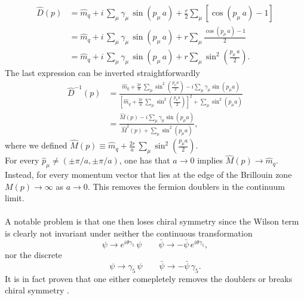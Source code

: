 \begin{equation*}
    \begin{aligned}
        \widehat{D}(p) &= \hat{m}_q + i \, \sum_\mu \gamma_\mu \, \sin\left( p_\mu \, a\right) + \frac{r}{2} \sum_\mu \left[\cos\left(p_\mu \, a\right) - 1\right] \\
        &= \hat{m}_q + i \, \sum_\mu \gamma_\mu \, \sin\left( p_\mu \, a\right) + r \sum_\mu \frac{\cos\left(p_\mu \, a\right) - 1}{2} \\
        &= \hat{m}_q + i \, \sum_\mu \gamma_\mu \, \sin\left( p_\mu \, a\right) + r \sum_\mu \sin^2\left(\frac{p_\mu \, a}{2}\right).
    \end{aligned}
\end{equation*}
The last expression can be inverted straightforwardly
\begin{equation*}
    \begin{aligned}
        \widehat{D}^{-1}(p) &= \frac{\hat{m}_q + \frac{2r}{a} \, \sum_\mu \sin ^2\left(\frac{p_\mu a}{2}\right) - i \sum_\mu \gamma_\mu \sin \left(p_\mu a\right)}{\left[\hat{m}_q + \frac{2r}{a} \, \sum_\mu \sin^2\left(\frac{p_\mu a}{2}\right)\right]^2 + \sum_\mu \sin^2 \left(p_\mu a\right)} \\
        &= \frac{\hat{M}(p) - i \sum_\mu \gamma_\mu \sin \left(p_\mu a\right)}{\hat{M}^2(p) + \sum_\mu \sin^2 \left(p_\mu a\right)},
    \end{aligned}
\end{equation*}
where we defined $\hat{M}(p) \equiv \hat{m}_q + \frac{2r}{a} \, \sum_\mu \sin ^2\left(\frac{p_\mu a}{2}\right)$. \\
For every $\hat p_\mu \neq (\pm \pi/a, \pm \pi/a)$, one has that $a \to 0$ implies $\hat{M}(p) \to \hat{m}_q$.\\
Instead, for every momentum vector that lies at the edge of the Brillouin zone $M(p) \to \infty$ as $a \to 0$. This removes the fermion doublers in the continuum limit. \\~\\
A notable problem is that one then loses chiral symmetry since the Wilson term is clearly not invariant under neither the continuous transformation
\begin{equation*}
    \psi \to e^{i \theta \gamma_5} \, \psi \qquad \bar\psi \to - \bar\psi \, e^{i \theta \gamma_5},
\end{equation*}
nor the discrete
\begin{equation*}
    \psi \to \gamma_5 \, \psi \qquad \bar\psi \to - \bar\psi \, \gamma_5.
\end{equation*}
It is in fact proven that one either comepletely removes the doublers or breaks chiral symmetry \cite{NIELSEN198120}.